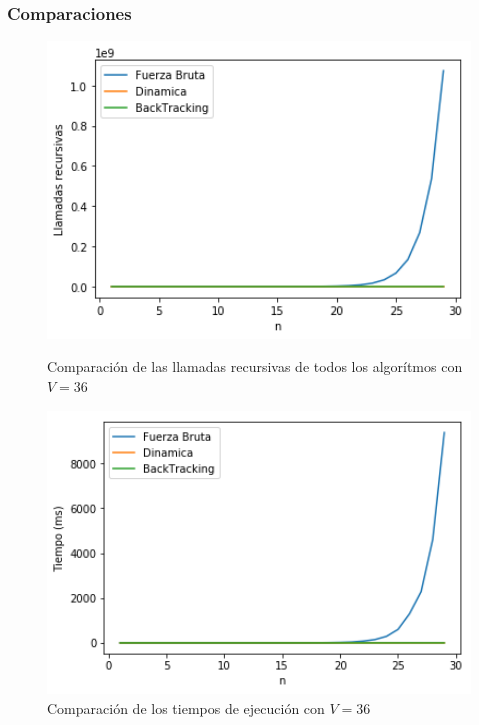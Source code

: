 \subsubsection{Comparaciones}
\begin{figure}[H] 
    \centering
    \begin{minipage}{0.45\textwidth}
        \centering
        \includegraphics[width=1\textwidth]{img/llamadas/v/todosLlamadasvChico.png} %
        \caption{Comparaci\'on de las llamadas recursivas de todos los algor\'itmos con $V = 36$}
        \label{fig:comparaTodosLlamadas}
    \end{minipage}\hfill
    \begin{minipage}{0.45\textwidth}
        \centering
        \includegraphics[width=1\textwidth]{img/tiempo/v/todosTiempo.png} %
        \caption{Comparaci\'on de los tiempos de ejecuci\'on con $V = 36$}
        \label{fig:comparaTodosTiempo}
    \end{minipage}\hfill
\end{figure}
